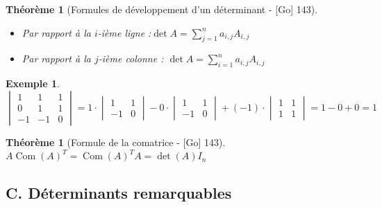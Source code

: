 \documentclass[10pt, a4paper, parskip=full, twoside, twocolumn]{report}
\newtheorem{theorem}[definition]{Théorème}
\newtheorem{example}[definition]{Exemple}
\DeclareMathOperator{\Com}{Com}
\begin{document}
\begin{theorem}[Formules de développement d'un déterminant - \textnormal{[Go] 143}]
	\begin{itemize}
		\item Par rapport à la $i$-ième ligne :$\det A = \sum_{j=1}^{n}a_{i,j}A_{i,j}$ 
		\item Par rapport à la $j$-ième colonne : $\det A = \sum_{i=1}^{n}a_{i,j}A_{i,j}$
	\end{itemize}
\end{theorem}

\begin{example}
	$\begin{vmatrix}
		1&1&1\\0&1&1\\-1&-1&0
	\end{vmatrix} = 1\cdot \begin{vmatrix}
		1&1\\-1&0
	\end{vmatrix} - 0\cdot \begin{vmatrix}
		1&1\\-1&0
	\end{vmatrix}+ (-1)\cdot \begin{vmatrix}
		1&1\\1&1
	\end{vmatrix}= 1-0+0 = 1$
\end{example}

\begin{theorem}[Formule de la comatrice - \textnormal{[Go] 143}]
	$A\Com(A)^T = \Com(A)^T A = \det(A)I_n$
\end{theorem}

\subsection*{C. Déterminants remarquables}
\end{document}
